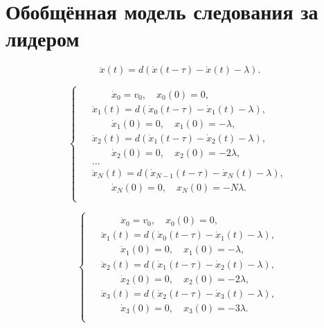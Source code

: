 \documentclass[12pt, a4paper]{extarticle}
\numberwithin{equation}{section}
\begin{document}
\section{Обобщённая модель следования за лидером}

\begin{equation*}
\ddot{x}(t) = d (\dot{x}(t-\tau)-\dot{x}(t) - \lambda).
\end{equation*}

\begin{equation*}
\begin{cases}
\begin{split}
&\qquad \dot{x}_0 = v_0, \quad x_0(0) = 0, \\
&\ddot{x}_1(t) = d (\dot{x}_0(t-\tau)-\dot{x}_1(t) - \lambda), \\ 
&\qquad \dot{x}_1(0) = 0, \quad x_1(0) = -\lambda, \\
&\ddot{x}_2(t) = d (\dot{x}_1(t-\tau)-\dot{x}_2(t) - \lambda), \\
&\qquad \dot{x}_2(0) = 0, \quad x_2(0) = -2\lambda, \\
&\ldots \\
&\ddot{x}_N(t) = d (\dot{x}_{N-1}(t-\tau)-\dot{x}_N(t) - \lambda), \\
&\qquad \dot{x}_N(0) = 0, \quad x_N(0) = -N\lambda. \\
\end{split}
\end{cases}
\end{equation*}

\begin{equation*}
\begin{cases}
\begin{split}
&\qquad \dot{x}_0 = v_0, \quad x_0(0) = 0, \\
&\ddot{x}_1(t) = d (\dot{x}_0(t-\tau)-\dot{x}_1(t) - \lambda), \\ 
&\qquad \dot{x}_1(0) = 0, \quad x_1(0) = -\lambda, \\
&\ddot{x}_2(t) = d (\dot{x}_1(t-\tau)-\dot{x}_2(t) - \lambda), \\
&\qquad \dot{x}_2(0) = 0, \quad x_2(0) = -2\lambda, \\
&\ddot{x}_3(t) = d (\dot{x}_2(t-\tau)-\dot{x}_3(t) - \lambda), \\
&\qquad \dot{x}_3(0) = 0, \quad x_3(0) = -3\lambda. \\
\end{split}
\end{cases}
\end{equation*}
\end{document}
